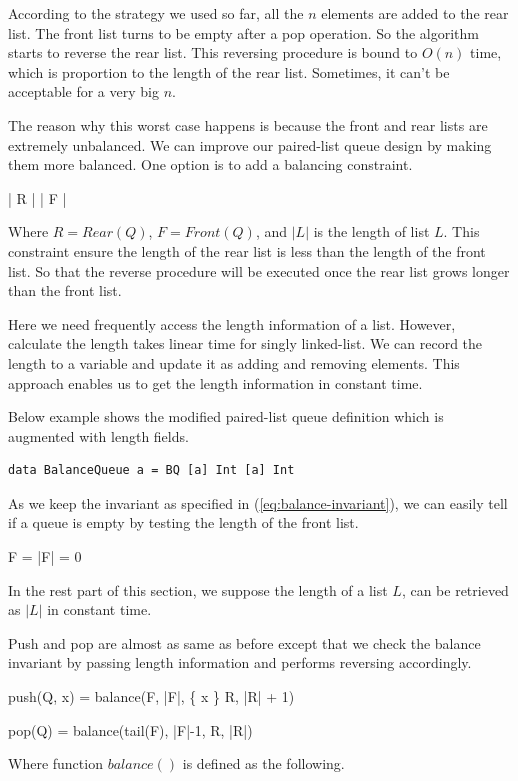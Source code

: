 \documentclass{article}
\begin{document}
According to the strategy we used so far, all the $n$ elements are added
to the rear list. The front list turns to be empty after a pop operation.
So the algorithm starts to reverse the rear list. This reversing procedure
is bound to $O(n)$ time, which is proportion to the length of the rear
list. Sometimes, it can't be
acceptable for a very big $n$.

The reason why this worst case happens is because the front and rear lists
are extremely unbalanced. We can improve our paired-list queue design
by making them more balanced. One option is to add a balancing constraint.

\be
  | R | \leq | F |
\label{eq:balance-invariant}
\ee

Where $R = Rear(Q)$, $F = Front(Q)$, and $|L|$ is the length of list $L$.
This constraint ensure the length
of the rear list is less than the length of the front list. So that the reverse
procedure will be executed once the rear list grows longer than
the front list.

Here we need frequently access the length information of a list. However,
calculate the length takes linear time for singly linked-list. We can
record the length to a variable and update it as adding and removing elements.
This approach enables us to get the length information in constant time.

Below example shows the modified paired-list queue definition which is augmented
with length fields.

\lstset{language=Haskell}
\begin{lstlisting}
data BalanceQueue a = BQ [a] Int [a] Int
\end{lstlisting}

As we keep the invariant as specified in (\ref{eq:balance-invariant}), we
can easily tell if a queue is empty by testing the length of the front list.

\be
  F = \phi \Leftrightarrow |F| = 0
\ee

In the rest part of this section, we suppose the length of a list $L$, can
be retrieved as $|L|$ in constant time.

Push and pop are almost as same as before except that we check the balance
invariant by passing length information and performs reversing accordingly.

\be
  push(Q, x) = balance(F, |F|, \{ x \} \cup R, |R| + 1)
\ee

\be
  pop(Q) = balance(tail(F), |F|-1, R, |R|)
\ee

Where function $balance()$ is defined as the following.
\end{document}

